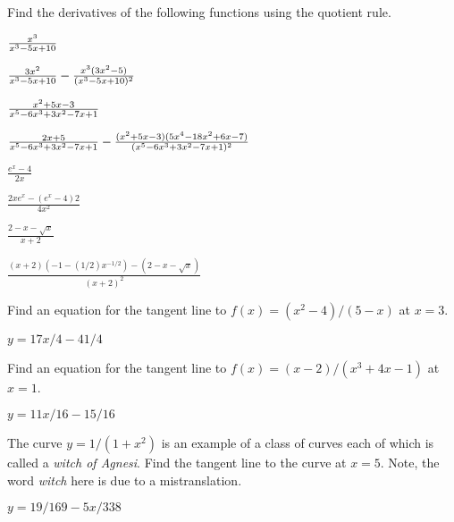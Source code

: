 \begin{exercises}

\noindent Find the derivatives of the following functions using the
quotient rule.

\twocol

\begin{exercise} ${x^3\over x^3-5x+10}$
\begin{answer} ${3x^2\over x^3-5x+10}-{x^3(3x^2-5)\over (x^3-5x+10)^2}$
\end{answer}\end{exercise}

\begin{exercise} ${x^2+5x-3\over x^5-6x^3+3x^2-7x+1}$
\begin{answer} ${2x+5\over x^5-6x^3+3x^2-7x+1}-
{(x^2+5x-3)(5x^4-18x^2+6x-7)\over(x^5-6x^3+3x^2-7x+1)^2}$
\end{answer}\end{exercise}


\begin{exercise} $\frac{e^x-4}{2x}$
\begin{answer} $\frac{2xe^x-(e^x-4)2}{4x^2}$
\end{answer}\end{exercise}

\begin{exercise} $\frac{2-x-\sqrt{x}}{x+2}$
\begin{answer} $\frac{(x+2)(-1-(1/2)x^{-1/2}) - (2-x-\sqrt{x})}{(x+2)^2}$
\end{answer}\end{exercise}
\endtwocol


\begin{exercise} Find an equation for the tangent line to $f(x) = (x^2 -
4)/(5-x)$ at $x= 3$.  
\begin{answer} $y=17x/4-41/4$ 
\end{answer}\end{exercise}

\begin{exercise}  Find an equation for the tangent line to 
$f(x) = (x-2)/(x^3 + 4x - 1)$ at $x=1$.
\begin{answer} $y=11x/16-15/16$
\end{answer}\end{exercise}

\begin{exercise} The curve $y=1/(1+x^2)$ is an example of a class of
curves each of which is called a \textit{witch of Agnesi}. Find the
tangent line to the curve at $x= 5$. Note, the word \textit{witch}
here is due to a mistranslation.
\begin{answer} $y=19/169-5x/338$
\end{answer}\end{exercise}
 


\end{exercises}
